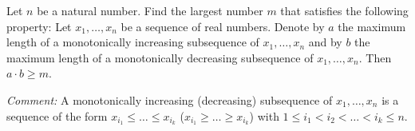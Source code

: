 Let $n$ be a natural number. Find the largest number $m$ that satisfies the following property:
Let $x_1,\ldots, x_n$ be a sequence of real numbers. Denote by $a$ the maximum length of a
monotonically increasing subsequence of $x_1,\ldots, x_n$ and by $b$ the maximum length of
a monotonically decreasing subsequence of $x_1,\ldots, x_n$. Then $a \cdot b \ge m$.

\emph{Comment:} A monotonically increasing (decreasing) subsequence of $x_1,\ldots, x_n$ is a
sequence of the form $x_{i_1} \le \dots \le x_{i_k}$ ($x_{i_1} \ge \dots \ge x_{i_k}$) with
$1 \le i_1<i_2<\dots <i_k \le n$.
